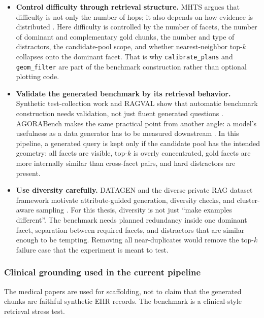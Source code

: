 \documentclass[11pt,a4paper]{article}
\newcommand{\field}[1]{\texttt{#1}}
\begin{document}
\begin{itemize}[noitemsep, topsep=0pt]
	\item \textbf{Control difficulty through retrieval structure.} MHTS argues that difficulty is not only the number of hops; it also depends on how evidence is distributed \citep{lee2025mhts}. Here difficulty is controlled by the number of facets, the number of dominant and complementary gold chunks, the number and type of distractors, the candidate-pool scope, and whether nearest-neighbor top-$k$ collapses onto the dominant facet. That is why \field{calibrate\_plans} and \field{geom\_filter} are part of the benchmark construction rather than optional plotting code.
	\item \textbf{Validate the generated benchmark by its retrieval behavior.} Synthetic test-collection work and RAGVAL show that automatic benchmark construction needs validation, not just fluent generated questions \citep{rahmani2024synthetic,kenneweg2024ragval}. AGORABench makes the same practical point from another angle: a model's usefulness as a data generator has to be measured downstream \citep{kim2025agorabench}. In this pipeline, a generated query is kept only if the candidate pool has the intended geometry: all facets are visible, top-$k$ is overly concentrated, gold facets are more internally similar than cross-facet pairs, and hard distractors are present.
	\item \textbf{Use diversity carefully.} DATAGEN and the diverse private RAG dataset framework motivate attribute-guided generation, diversity checks, and cluster-aware sampling \citep{huang2025datagen,driouich2025diverseprivate}. For this thesis, diversity is not just ``make examples different''. The benchmark needs planned redundancy inside one dominant facet, separation between required facets, and distractors that are similar enough to be tempting. Removing all near-duplicates would remove the top-$k$ failure case that the experiment is meant to test.
\end{itemize}

\subsubsection{Clinical grounding used in the current pipeline}

The medical papers are used for scaffolding, not to claim that the generated chunks are faithful synthetic EHR records. The benchmark is a clinical-style retrieval stress test.
\end{document}
